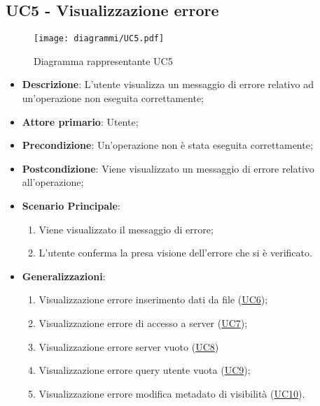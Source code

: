 \subsection{UC5 - Visualizzazione errore}
\label{sub:uc5}

\begin{figure}[h]
    \centering
    \texttt{[image: diagrammi/UC5.pdf]}
    \caption{Diagramma rappresentante UC5}
    \label{fig:UC5}
\end{figure}

\begin{itemize}
    \item \textbf{Descrizione}: L'utente visualizza un messaggio di errore relativo ad un'operazione non eseguita 
    correttamente;

    \item \textbf{Attore primario}: Utente;
    
    \item \textbf{Precondizione}:   Un'operazione non è stata eseguita correttamente; 

    \item \textbf{Postcondizione}:  Viene visualizzato un messaggio di errore relativo all'operazione;
    
    \item \textbf{Scenario Principale}:
    \begin{enumerate}
        \item Viene visualizzato il messaggio di errore;
        \item L'utente conferma la presa visione dell'errore che si è verificato.
    \end{enumerate}

    \item \textbf{Generalizzazioni}:
    \begin{enumerate}
        \item Visualizzazione errore inserimento dati da file (\hyperref[sub:uc6]{UC6});
        \item Visualizzazione errore di accesso a server (\hyperref[sub:uc7]{UC7});
        \item Visualizzazione errore server vuoto (\hyperref[sub:uc8]{UC8})
        \item Visualizzazione errore query utente vuota (\hyperref[sub:uc9]{UC9});
        \item Visualizzazione errore modifica metadato di visibilità (\hyperref[sub:uc10]{UC10}).
    \end{enumerate}

\end{itemize}

